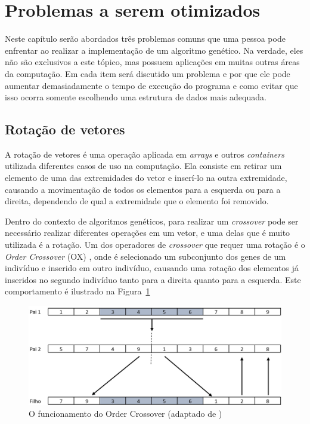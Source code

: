 \documentclass[12pt]{article}
\begin{document}
\section{Problemas a serem otimizados}

Neste cap\'{i}tulo ser\~{a}o abordados tr\^{e}s problemas comuns que uma pessoa pode enfrentar ao
realizar a implementa\c{c}\~{a}o de um algoritmo gen\'{e}tico. Na verdade, eles n\~{a}o s\~{a}o
exclusivos a este t\'{o}pico, mas possuem aplica\c{c}\~{o}es em muitas outras \'{a}reas
da computa\c{c}\~{a}o. Em cada item ser\'{a} discutido um problema e por que ele
pode aumentar demasiadamente o tempo de execu\c{c}\~{a}o do programa e como evitar que
isso ocorra somente escolhendo uma estrutura de dados mais adequada.

\subsection{Rota\c{c}\~{a}o de vetores}

A rota\c{c}\~{a}o de vetores \'{e} uma opera\c{c}\~{a}o aplicada em \textit{arrays} e outros
\textit{containers} utilizada diferentes casos de uso na computa\c{c}\~{a}o.
Ela consiste em retirar um elemento de uma das extremidades do vetor e
inser\'{i}-lo na outra extremidade, causando a movimenta\c{c}\~{a}o de todos os elementos
para a esquerda ou para a direita, dependendo de qual a extremidade que o elemento
foi removido.

Dentro do contexto de algoritmos gen\'{e}ticos, para realizar um \textit{crossover} pode ser
necess\'{a}rio realizar diferentes opera\c{c}\~{o}es em um vetor, e uma delas que \'{e} muito
utilizada \'{e} a rota\c{c}\~{a}o. Um dos operadores de \textit{crossover} que requer uma
rota\c{c}\~{a}o \'{e} o \textit{Order Crossover} (OX) \cite{misc:geneticOperations}, onde \'{e} selecionado um subconjunto dos genes
de um indiv\'{i}duo e inserido em outro indiv\'{i}duo, causando uma rota\c{c}\~{a}o dos elementos j\'{a}
inseridos no segundo indiv\'{i}duo tanto para a direita quanto para a esquerda. Este comportamento \'{e}
ilustrado na Figura~\ref{fig:orderCrossover}

\begin{figure}[ht]
    \centering
    \includegraphics[width=.8\textwidth]{order_crossover.jpg}
    \caption{O funcionamento do Order Crossover (adaptado de \cite{misc:geneticOperations})}
    \label{fig:orderCrossover}
\end{figure}
\end{document}
